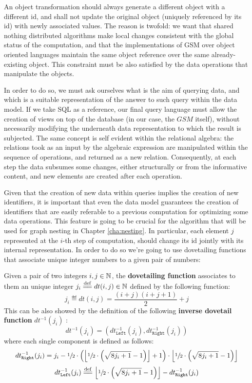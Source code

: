 An object transformation should always generate a different object with a different id, and shall not update the original object (uniquely referenced by its id) with newly associated values. The reason is twofold: we want that shared nothing distributed algorithms make local changes consistent with the global status of the computation, and that the implementations of GSM over object oriented languages maintain the same object reference over the same already-existing object.  This constraint must be also satisfied by the data operations that manipulate the objects.

In order to do so, we must ask ourselves what is the aim of querying data, and which is a suitable representation of the answer to such query within the data model. If we take SQL as a reference, our final query language must allow the creation of views on top of the database (in our case, the $GSM$ itself), without necessarily modifying the underneath data representation to which the result is subjected. The same concept is self evident within the relational algebra: the relations took as an input by the algebraic expression are manipulated within the sequence of operations, and returned as a new relation. Consequently, at each step the data subsumes some changes, either structurally or from the informative content, and new elements are created after each operation. 



Given that the creation of new data within queries implies the creation of new identifiers, it is important that even the data model guarantees the creation of identifiers that are easily referable to a previous computation \cite{bergami2014} for optimizing some data operations. This feature is going to be crucial for the algorithm that will be used for graph nesting in Chapter \vref{cha:nesting}. In particular, each element $j$ represented at the $i$-th step of computation, should change its id  jointly with its internal representation. In order to do so we're going to use dovetailing functions \cite{odifreddi1992} that associate unique integer numbers to a given pair of numbers:

\begin{definition}
Given a pair of two integers $i,j\in \mathbb{N}$, the \textbf{dovetailing function} associates to them an unique integer  $j_i\overset{\mathrm{def}}{=\mathrel{\mkern-3mu}=} dt(i,j)\in\mathbb{N}$ defined by the following function:
\[j_i\eqdef dt(i,j)=\frac{(i+j)(i+j+1)}{2}+j\]
This can be also showed by the definition of the following \textbf{inverse dovetail function} $dt^{-1}(j_i)$ \cite{bergami2014}:
\[dt^{-1}(j_i)=(dt_{\texttt{Left}}^{-1}(j_i),dt_{\texttt{Right}}^{-1}(j_i))\]
where each single component is defined as follows:
\[dt_{\texttt{Right}}^{-1}(j_i)= j_i - \sfrac{1}{2}\cdot\left(\left\lfloor\sfrac{1}{2}\cdot{\left(\sqrt{8j_i+1}-1\right)}\right\rfloor + 1\right)\cdot \left\lfloor\sfrac{1}{2}\cdot{\left(\sqrt{8j_i+1}-1\right)}\right\rfloor\]
\[dt_{\texttt{Left}}^{-1}(j_i) \overset{\mathrm{def}}{=\mathrel{\mkern-3mu}=} \left\lfloor\sfrac{1}{2}\cdot{\left(\sqrt{8j_i+1}-1\right)}\right\rfloor - dt_{\texttt{Right}}^{-1}(j_i)\]
\end{definition}



